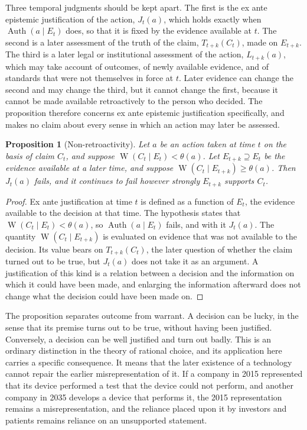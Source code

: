 \documentclass[11pt]{article}
\theoremstyle{plain}
\newtheorem{proposition}{Proposition}
\theoremstyle{definition}
\theoremstyle{remark}
\newcommand{\Auth}{\operatorname{Auth}}
\newcommand{\Warr}{\operatorname{W}}
\begin{document}
Three temporal judgments should be kept apart. The first is the ex ante epistemic justification of the action, $J_t(a)$, which holds exactly when $\Auth(a \mid E_t)$ does, so that it is fixed by the evidence available at $t$. The second is a later assessment of the truth of the claim, $T_{t+k}(C_t)$, made on $E_{t+k}$. The third is a later legal or institutional assessment of the action, $L_{t+k}(a)$, which may take account of outcomes, of newly available evidence, and of standards that were not themselves in force at $t$. Later evidence can change the second and may change the third, but it cannot change the first, because it cannot be made available retroactively to the person who decided. The proposition therefore concerns ex ante epistemic justification specifically, and makes no claim about every sense in which an action may later be assessed.

\begin{proposition}[Non-retroactivity]
Let $a$ be an action taken at time $t$ on the basis of claim $C_t$, and suppose $\Warr(C_t \mid E_t) < \theta(a)$. Let $E_{t+k} \supseteq E_t$ be the evidence available at a later time, and suppose $\Warr(C_t \mid E_{t+k}) \ge \theta(a)$. Then $J_t(a)$ fails, and it continues to fail however strongly $E_{t+k}$ supports $C_t$.
\end{proposition}

\begin{proof}
Ex ante justification at time $t$ is defined as a function of $E_t$, the evidence available to the decision at that time. The hypothesis states that $\Warr(C_t \mid E_t) < \theta(a)$, so $\Auth(a \mid E_t)$ fails, and with it $J_t(a)$. The quantity $\Warr(C_t \mid E_{t+k})$ is evaluated on evidence that was not available to the decision. Its value bears on $T_{t+k}(C_t)$, the later question of whether the claim turned out to be true, but $J_t(a)$ does not take it as an argument. A justification of this kind is a relation between a decision and the information on which it could have been made, and enlarging the information afterward does not change what the decision could have been made on.
\end{proof}

The proposition separates outcome from warrant. A decision can be lucky, in the sense that its premise turns out to be true, without having been justified. Conversely, a decision can be well justified and turn out badly. This is an ordinary distinction in the theory of rational choice, and its application here carries a specific consequence. It means that the later existence of a technology cannot repair the earlier misrepresentation of it. If a company in 2015 represented that its device performed a test that the device could not perform, and another company in 2035 develops a device that performs it, the 2015 representation remains a misrepresentation, and the reliance placed upon it by investors and patients remains reliance on an unsupported statement.
\end{document}
